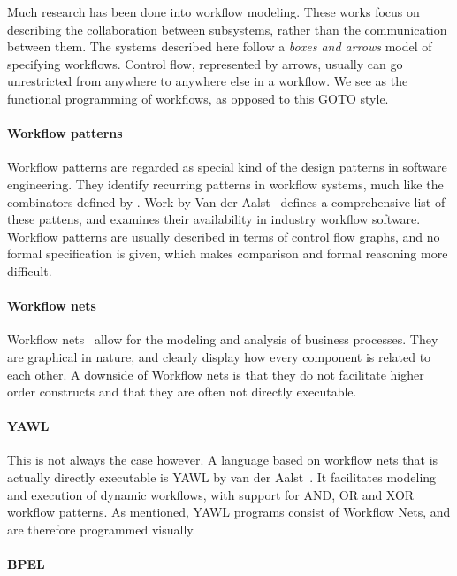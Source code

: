 Much research has been done into workflow modeling. These works focus on
describing the collaboration between subsystems, rather than the communication
between them.
The systems described here follow a \emph{boxes and arrows} model of specifying workflows.
Control flow, represented by arrows, usually can go unrestricted from anywhere to anywhere else in a workflow.
We see \TOP as the functional programming of workflows, as opposed to this GOTO style.


\paragraph{Workflow patterns}

Workflow patterns are regarded as special kind of the design patterns in
software engineering. They identify recurring patterns in workflow systems, much
like the combinators defined by \TOPHAT. Work by Van der
Aalst~\cite{journals/dpd/AalstHKB03} defines a comprehensive list of these
pattens, and examines their availability in industry workflow software.
Workflow patterns are usually described in terms of control flow graphs, and no
formal specification is given, which makes comparison and formal reasoning more
difficult.

\paragraph{Workflow nets}

Workflow nets~\cite{journals/jcsc/Aalst98} allow for the modeling and analysis
of business processes. They are graphical in nature, and clearly display how
every component is related to each other. A downside of Workflow nets is that
they do not facilitate higher order constructs and that they are often not
directly executable.

\paragraph{YAWL}

This is not always the case however. A language based on workflow nets that is
actually directly executable is YAWL by van der
Aalst~\cite{DBLP:journals/is/AalstH05}. It facilitates modeling and execution of
dynamic workflows, with support for AND, OR and XOR workflow patterns. As
mentioned, YAWL programs consist of Workflow Nets, and are therefore programmed
visually.

\paragraph{BPEL}

